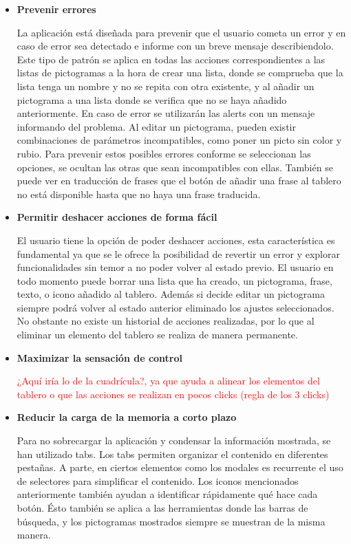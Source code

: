 \begin{itemize}
	\item \textbf{Prevenir errores}
	
	La aplicación está diseñada para prevenir que el usuario cometa un error y en caso de error sea detectado e informe con un breve mensaje describiendolo.  
	Este tipo de patrón se aplica en todas las acciones correspondientes a las listas de pictogramas a la hora de crear una lista, donde se comprueba que la lista tenga un nombre y no se repita con otra existente, y al añadir un pictograma a una lista donde se verifica que no se haya añadido anteriormente. En caso de error se utilizarán las alerts con un mensaje informando del problema.
	Al editar un pictograma, pueden existir combinaciones de parámetros incompatibles, como poner un picto sin color y rubio. Para prevenir estos posibles errores conforme se seleccionan las opciones, se ocultan las otras que sean incompatibles con ellas. 
	También se puede ver en traducción de frases que el botón de añadir una frase al tablero no está disponible hasta que no haya una frase traducida. 
	
	\item \textbf{Permitir deshacer acciones de forma fácil}
	
	El usuario tiene la opción de poder deshacer acciones, esta característica es fundamental ya que se le ofrece la posibilidad de revertir un error y explorar funcionalidades sin temor a no poder volver al estado previo.
	El usuario en todo momento puede borrar una lista que ha creado, un pictograma, frase, texto, o icono añadido al tablero. Además si decide editar un pictograma siempre podrá volver al estado anterior eliminado los ajustes seleccionados. 
	No obstante no existe un historial de acciones realizadas, por lo que al eliminar un elemento del tablero se realiza de manera permanente.
	
	\item \textbf{Maximizar la sensación de control}
	
	
	\textcolor{red}{¿Aquí iría lo de la cuadrícula?, ya que ayuda a alinear los elementos del tablero o que las acciones se realizan en pocos clicks (regla de los 3 clicks) }
	
	\item \textbf{Reducir la carga de la memoria a corto plazo}
	
	Para no sobrecargar la aplicación y condensar la información mostrada, se han utilizado tabs. Los tabs permiten organizar el contenido en diferentes pestañas. A parte, en ciertos elementos como los modales es recurrente el uso de selectores para simplificar el contenido.
	Los iconos mencionados anteriormente también ayudan a identificar rápidamente qué hace cada botón. Ésto también se aplica a las herramientas donde las barras de búsqueda, y los pictogramas mostrados siempre se muestran de la misma manera. 
	
\end{itemize}
